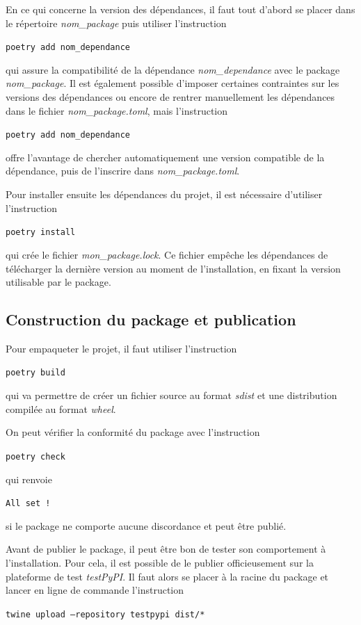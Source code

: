 \documentclass[twoside,a4paper,11pt,frenchb,openany]{report}
\begin{document}
En ce qui concerne la version des dépendances, il faut tout d'abord se placer dans le répertoire \textit{nom\_package} puis utiliser l’instruction
\begin{tcolorbox}\texttt{poetry add nom\_dependance}\end{tcolorbox}  
qui assure la compatibilité de la dépendance \textit{nom\_dependance} avec le package \textit{nom\_package}. Il est également possible d’imposer certaines contraintes sur les versions des dépendances ou encore de rentrer manuellement les dépendances dans le fichier \textit{nom\_package.toml}, mais l’instruction 
\begin{tcolorbox}\texttt{poetry add nom\_dependance}\end{tcolorbox}  
offre l’avantage de chercher automatiquement une version compatible de la dépendance, puis de l’inscrire dans \textit{nom\_package.toml}.

Pour installer ensuite les dépendances du projet, il est nécessaire d’utiliser l’instruction
\begin{tcolorbox}\texttt{poetry install}\end{tcolorbox}
qui crée le fichier \textit{mon\_package.lock}. Ce fichier empêche les dépendances de télécharger la dernière version au moment de l’installation, en fixant la version utilisable par le package.


\subsection{Construction du package et publication}

Pour empaqueter le projet, il faut utiliser l’instruction
\begin{tcolorbox}\texttt{poetry build}\end{tcolorbox}
qui va permettre de créer un fichier source au format \textit{sdist} et une distribution compilée au format \textit{wheel}.

On peut vérifier la conformité du package avec l’instruction
\begin{tcolorbox}\texttt{poetry check}\end{tcolorbox}
qui renvoie
\begin{tcolorbox}\texttt{All set !}\end{tcolorbox}
si le package ne comporte aucune discordance et peut être publié.

Avant de publier le package, il peut être bon de tester son comportement à l'installation. Pour cela, il est possible de le publier officieusement sur la plateforme de test \textit{testPyPI}. Il faut alors se placer à la racine du package et lancer en ligne de commande l'instruction
\begin{tcolorbox}\texttt{twine upload --repository testpypi dist/*}\end{tcolorbox}
\end{document}
